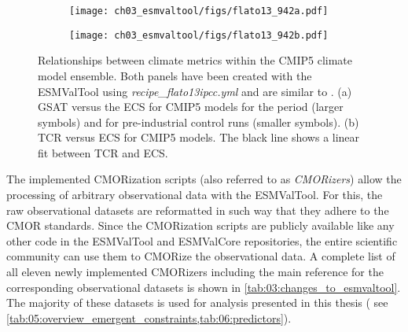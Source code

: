 \begin{figure}[t]
  \centering
  \begin{subfigure}[b]{0.36\columnwidth}
    \texttt{[image: ch03\_esmvaltool/figs/flato13\_942a.pdf]}
    \caption{}
    \label{fig:03:flato13:a}
  \end{subfigure}
  \begin{subfigure}[b]{0.36\columnwidth}
    \texttt{[image: ch03\_esmvaltool/figs/flato13\_942b.pdf]}
    \caption{}
    \label{fig:03:flato13:b}
  \end{subfigure}
  \begin{subfigure}[b]{0.26\columnwidth}
  \end{subfigure}
  \caption[
    Relationships between climate metrics within the \acs{CMIP}5 climate model
    ensemble.
  ]{
    Relationships between climate metrics within the \acs{CMIP}5 climate model
    ensemble. Both panels have been created with the \acs{ESMValTool} using
    \emph{recipe\_flato13ipcc.yml} and are similar to \textcite{Flato2013}. (a)
    \Acf{GSAT} versus the \acf{ECS} for \acs{CMIP}5 models for the period
     (larger symbols) and for pre-industrial control runs
    (smaller symbols). (b) \Acf{TCR} versus \acs{ECS} for \acs{CMIP}5 models.
    The black line shows a linear fit between \acs{TCR} and \acs{ECS}.
  }
  \label{fig:03:flato13}
\end{figure}

The implemented \ac{CMOR}ization scripts (also referred to as
\emph{\ac{CMOR}izers}) allow the processing of arbitrary observational data
with the \ac{ESMValTool}. For this, the raw observational datasets are
reformatted in such way that they adhere to the \ac{CMOR} standards. Since the
\ac{CMOR}ization scripts are publicly available like any other code in the
\ac{ESMValTool} and \ac{ESMValCore} repositories, the entire scientific
community can use them to \ac{CMOR}ize the observational data. A complete list
of all eleven newly implemented \ac{CMOR}izers including the main reference for
the corresponding observational datasets is shown in
\cref{tab:03:changes_to_esmvaltool}. The majority of these datasets is used for
analysis presented in this thesis (\eg{} see
\cref{tab:05:overview_emergent_constraints,tab:06:predictors}).
